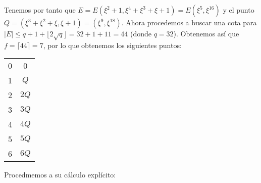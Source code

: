 \documentclass[fleqn]{article}
\begin{document}
    Tenemos por tanto que $E = E(\xi^2 + 1, \xi^4 + \xi^3 + \xi + 1) = E(\xi^5, \xi^{16})$ y  el punto $Q = (\xi^3 + \xi^2 + \xi, \xi + 1) = 
    (\xi^9, \xi^{18})$. Ahora procedemos a buscar una cota para $|E| \leq q + 1 + \lfloor 2 \sqrt{q} \rfloor = 32 + 1 + 11 = 44$ (donde $q = 32$).
    Obtenemos así que $f = \lceil 44 \rceil = 7$, por lo que obtenemos los siguientes puntos:
    \begin{center}
        \begin{tabular}{| c | c |}
            \hline
            0 & 0 \\
            1 & $Q$ \\
            2 & $2Q$ \\
            3 & $3Q$ \\
            4 & $4Q$ \\
            5 & $5Q$ \\
            6 & $6Q$ \\ \hline
        \end{tabular}
    \end{center}

    Procedmemos a su cálculo explícito:
\end{document}
